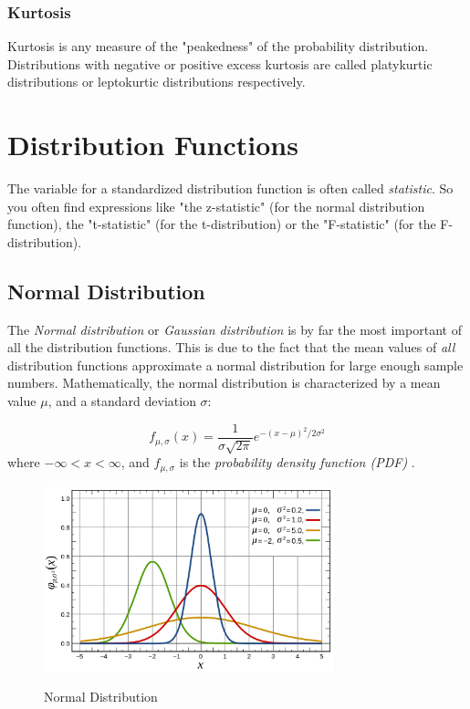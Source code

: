 \subsubsection{Kurtosis}

Kurtosis is any measure of the "peakedness" of the probability distribution. Distributions with negative or positive excess kurtosis are called platykurtic distributions or leptokurtic distributions respectively.


\section{Distribution Functions}

The variable for a standardized distribution function is often called \emph{statistic}. So you often find expressions like "the z-statistic" (for the normal distribution function), the "t-statistic" (for the t-distribution) or the "F-statistic" (for the F-distribution).

\subsection{Normal Distribution} \label{sec:normalDistribution}

The \emph{Normal distribution} or \emph{Gaussian distribution} is by far the most important of all the distribution functions. This is due to the fact that the mean values of \emph{all} distribution functions approximate a normal distribution for large enough sample numbers.
Mathematically, the normal distribution is characterized by a mean value $\mu$, and a standard deviation $\sigma$:

\begin{equation}\label{eq_normal}
     f_{\mu,\sigma} (x) = \frac{1}{\sigma \sqrt{2 \pi}} e^{-( x - \mu )^2 /2 \sigma^2}
\end{equation}
where $ - \infty < x < \infty $, and $f_{\mu,\sigma}$ is the \emph{probability density function (PDF)} .

\begin{figure}
  \centering
  \includegraphics[width=0.75\textwidth]{../Images/Normal_Distribution_PDF.png}\\
  \caption{Normal Distribution}\label{fig:normal}
\end{figure}

